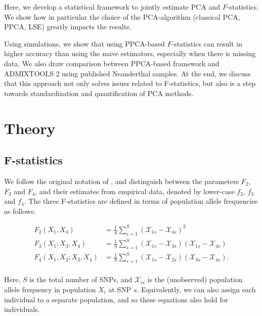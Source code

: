 \documentclass[12pt, letterpaper]{article}
\begin{document}
Here, we develop a statistical framework to jointly estimate PCA and $F$-statistics. We show how in particular the choice of the PCA-algorithm (classical PCA, PPCA, LSE) greatly impacts the results.

Using simulations, we show that using PPCA-based $F$-statistics can result in higher accuracy than using the naive estimators, especially when there is missing data. We also draw comparison between PPCA-based framework and ADMIXTOOLS 2 using published Neanderthal samples. At the end, we discuss that this approach not only solves issues related to F-statistics, but also is a step towards standardization and quantification of PCA methods.

\section{Theory}\label{theory}

\subsection{F-statistics}\label{fstats}
We follow the original notation of \cite{patterson_ancient_2012}, and distinguish between the parameters $F_2$, $F_3$ and $F_4$, and their estimates from empirical data, denoted by lower-case $f_2$, $f_3$ and $f_4$. The three F-statistics are defined in terms of population allele frequencies as follows:

\begin{align}\label{eq:f_intro}
F_2(X_1,X_4) &= \frac{1}{S}\sum_{s=1}^S(\mathcal{X}_{1s} - \mathcal{X}_{4s})^2\nonumber\\
F_3(X_1;X_3,X_4) &= \frac{1}{S}\sum_{s=1}^S(\mathcal{X}_{1s} - \mathcal{X}_{3s})(\mathcal{X}_{1s} - \mathcal{X}_{4s})\nonumber\\
F_4(X_1,X_2;X_3,X_4) &= \frac{1}{S}\sum_{s=1}^S(\mathcal{X}_{1s} - \mathcal{X}_{2s})(\mathcal{X}_{3s} - \mathcal{X}_{4s}).\nonumber\\
\end{align}

Here, $S$ is the total number of SNPs, and $\mathcal{X}_{is}$ is the (unobserved) population allele frequency in population $X_i$ at SNP $s$. Equivalently, we can also assign each individual to a separate population, and so these equations also hold for individuals.
\end{document}
